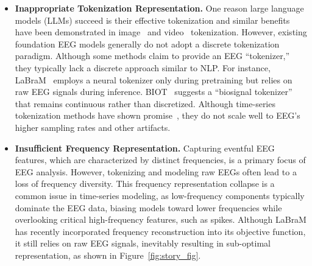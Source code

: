 \begin{itemize}[left=0pt]
    \item \textbf{Inappropriate Tokenization Representation. } One reason large language models (LLMs) succeed is their effective tokenization and similar benefits have been demonstrated in image~\cite{van2017neural} and video~\cite{wang2024larp,agarwal2025cosmos} tokenization. However, existing foundation EEG models generally do not adopt a discrete tokenization paradigm. Although some methods claim to provide an EEG “tokenizer,” they typically lack a discrete approach similar to NLP. For instance, LaBraM~\cite{jiang2024large} employs a neural tokenizer only during pretraining but relies on raw EEG signals during inference.
    BIOT~\cite{yang2024biot} suggests a “biosignal tokenizer” that remains continuous rather than discretized. Although time-series tokenization methods have shown promise~\cite{ansari2024chronos,rasul2023lag}, they do not scale well to EEG’s higher sampling rates and other artifacts. 
    
    
    
     \item \textbf{Insufficient Frequency Representation. }
     Capturing eventful EEG features, which are characterized by distinct frequencies, is a primary focus of EEG analysis.
     However, tokenizing and modeling raw EEGs often lead to a loss of frequency diversity.
     This frequency representation collapse is a common issue in time-series modeling, as low-frequency components typically dominate the EEG data, biasing models toward lower frequencies while overlooking critical high-frequency features, such as spikes. Although LaBraM has recently incorporated frequency reconstruction into its objective function, it still relies on raw EEG signals, inevitably resulting in sub-optimal representation, as shown in Figure~\ref{fig:story_fig}.
     

\end{itemize}
